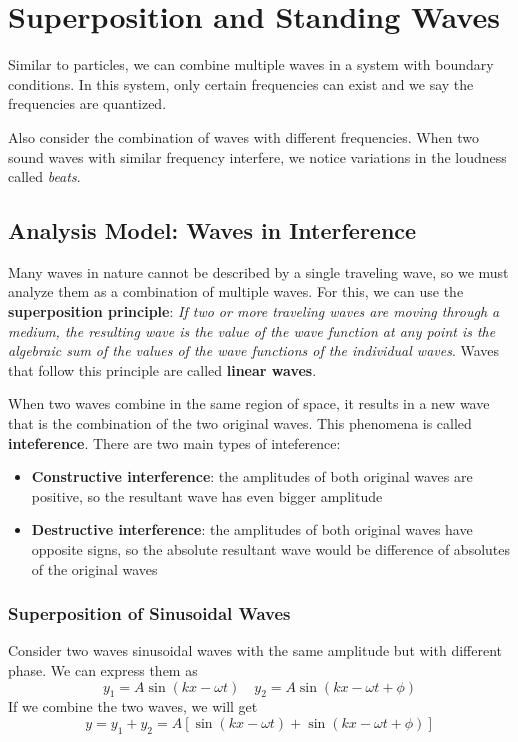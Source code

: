 \chapter{Superposition and Standing Waves}

Similar to particles, we can combine multiple waves in a system
with boundary conditions. In this system, only certain frequencies
can exist and we say the frequencies are quantized. 

Also consider the combination of waves with different frequencies.
When two sound waves with similar frequency interfere, we notice 
variations in the loudness called \textit{beats}.

\section{Analysis Model: Waves in Interference}

Many waves in nature cannot be described by a single traveling wave, 
so we must analyze them as a combination of multiple waves. For this,
we can use the \textbf{superposition principle}: \textit{If two or
more traveling waves are moving through a medium, the resulting
wave is the value of the wave function at any point is the algebraic
sum of the values of the wave functions of the individual waves}.
Waves that follow this principle are called \textbf{linear waves}.

When two waves combine in the same region of space, it results in a new wave 
that is the combination of the two original waves. This phenomena is called
\textbf{inteference}. There are two main types of inteference:
\begin{itemize}
    \item \textbf{Constructive interference}: the amplitudes of both original waves are
        positive, so the resultant wave has even bigger amplitude
    \item \textbf{Destructive interference}: the amplitudes of both original waves have
        opposite signs, so the absolute resultant wave would be difference of absolutes
        of the original waves
\end{itemize}

\subsection{Superposition of Sinusoidal Waves}

Consider two waves sinusoidal waves with the same amplitude but with different phase.
We can express them as 
\[ y_1 = A\sin(kx - \omega t) \quad y_2 = A\sin(kx - \omega t + \phi) \]
If we combine the two waves, we will get
\[ y = y_1 + y_2 = A\left[\sin(kx - \omega t) + \sin(kx - \omega t + \phi)\right] \]


